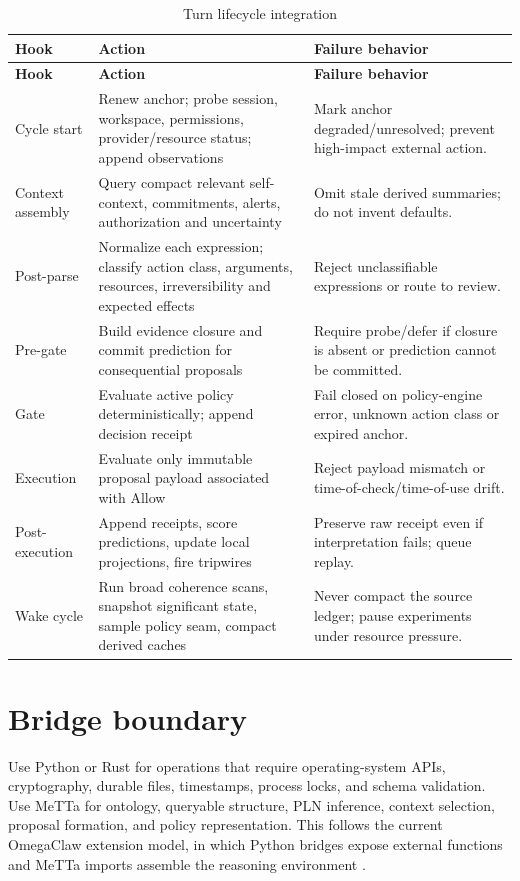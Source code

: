 \documentclass[11pt,oneside]{report}
\begin{document}
\begin{longtable}{@{}L{1.30in}L{1.90in}L{3.25in}@{}}
\caption{Turn lifecycle integration}\label{tab:lifecycle}\\
\toprule
\textbf{Hook} & \textbf{Action} & \textbf{Failure behavior} \\
\midrule
\endfirsthead
\toprule
\textbf{Hook} & \textbf{Action} & \textbf{Failure behavior} \\
\midrule
\endhead
Cycle start & Renew anchor; probe session, workspace, permissions, provider/resource status; append observations & Mark anchor degraded/unresolved; prevent high-impact external action. \\
Context assembly & Query compact relevant self-context, commitments, alerts, authorization and uncertainty & Omit stale derived summaries; do not invent defaults. \\
Post-parse & Normalize each expression; classify action class, arguments, resources, irreversibility and expected effects & Reject unclassifiable expressions or route to review. \\
Pre-gate & Build evidence closure and commit prediction for consequential proposals & Require probe/defer if closure is absent or prediction cannot be committed. \\
Gate & Evaluate active policy deterministically; append decision receipt & Fail closed on policy-engine error, unknown action class or expired anchor. \\
Execution & Evaluate only immutable proposal payload associated with Allow & Reject payload mismatch or time-of-check/time-of-use drift. \\
Post-execution & Append receipts, score predictions, update local projections, fire tripwires & Preserve raw receipt even if interpretation fails; queue replay. \\
Wake cycle & Run broad coherence scans, snapshot significant state, sample policy seam, compact derived caches & Never compact the source ledger; pause experiments under resource pressure. \\
\bottomrule
\end{longtable}

\section{Bridge boundary}

Use Python or Rust for operations that require operating-system APIs, cryptography, durable files, timestamps, process locks, and schema validation. Use MeTTa for ontology, queryable structure, PLN inference, context selection, proposal formation, and policy representation. This follows the current OmegaClaw extension model, in which Python bridges expose external functions and MeTTa imports assemble the reasoning environment \cite{omegaclaw-extension}.
\end{document}
